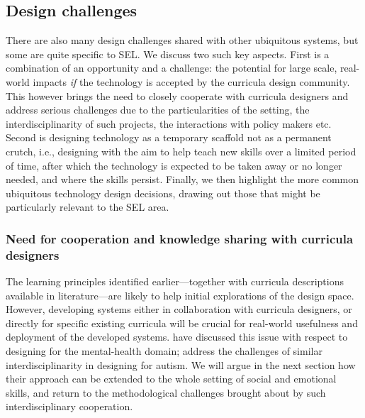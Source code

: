 \documentclass[prodmode,acmtochi]{acmsmall}
\newcommand{\rephrase}[1]{\textrm{\textrm{\textcolor{gray}{#1}}}}
\begin{document}
\subsection{Design challenges}

There are also many design challenges shared with other ubiquitous systems, but some are quite specific to SEL. We discuss two such key aspects. First is a combination of an opportunity and a challenge: the potential for large scale, real-world impacts \emph{if} the technology is accepted by the curricula design community. This however brings the need to closely cooperate with curricula designers and address serious challenges due to the particularities of the setting, the interdisciplinarity of such projects, the interactions with policy makers etc. Second is designing technology as a temporary scaffold not as a permanent crutch, i.e., designing with the aim to help teach new skills over a limited period of time, after which the technology is expected to be taken away or no longer needed, and where the skills persist. 
Finally, we then highlight the more common ubiquitous technology design decisions, drawing out those that might be particularly relevant to the SEL area.
 
        \subsubsection{Need for cooperation and knowledge sharing with curricula designers}
        The learning principles identified earlier---together with curricula descriptions available in literature---are likely to help initial explorations of the design space. However, developing systems either in collaboration with curricula designers, or directly for specific existing curricula will be crucial for real-world usefulness and deployment of the developed systems. %
         have discussed this issue with respect to designing for the mental-health domain;   address the challenges of similar interdisciplinarity in designing for autism. We will argue in the next section how their approach can be extended to the whole setting of social and emotional skills, and return to the methodological challenges brought about by such interdisciplinary cooperation. 
\end{document}
